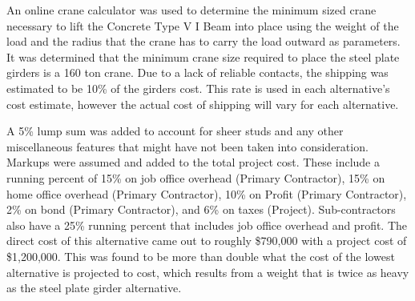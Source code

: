 An online crane calculator was used to determine the minimum sized crane necessary to lift the Concrete Type V I Beam into place using the weight of the load and the radius that the crane has to carry the load outward as parameters. It was determined that the minimum crane size required to place the steel plate girders is a 160 ton crane. Due to a lack of reliable contacts, the shipping was estimated to be 10\% of the girders cost. This rate is used in each alternative's cost estimate, however the actual cost of shipping will vary for each alternative.

A 5\% lump sum was added to account for sheer studs and any other miscellaneous features that might have not been taken into consideration. Markups were assumed and added to the total project cost. These include a running percent of 15\% on job office overhead (Primary Contractor), 15\% on home office overhead (Primary Contractor), 10\% on Profit (Primary Contractor), 2\% on bond (Primary Contractor), and 6\% on taxes (Project). Sub-contractors also have a 25\% running percent that includes job office overhead and profit. The direct cost of this alternative came out to roughly \$790,000 with a project cost of \$1,200,000. This was found to be more than double what the cost of the lowest alternative is projected to cost, which results from a weight that is twice as heavy as the steel plate girder alternative.




